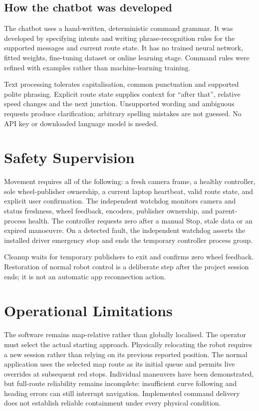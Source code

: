\documentclass[10pt,a4paper,twocolumn]{article}
\begin{document}
\subsection{How the chatbot was developed}

The chatbot uses a hand-written, deterministic command grammar. It was
developed by specifying intents and writing phrase-recognition rules for the
supported messages and current route state. It has no trained
neural network, fitted weights, fine-tuning dataset or online learning stage.
Command rules were refined with examples rather than machine-learning training.

Text processing tolerates capitalisation, common punctuation and supported
polite phrasing. Explicit route state supplies context for ``after that'',
relative speed changes and the next junction. Unsupported wording and
ambiguous requests produce clarification; arbitrary spelling mistakes are not
guessed. No API key or downloaded language model is needed.

\section{Safety Supervision}

Movement requires all of the following: a fresh camera frame, a healthy
controller, sole wheel-publisher ownership, a current laptop heartbeat, valid
route state, and explicit user confirmation. The independent watchdog monitors
camera and status freshness, wheel feedback, encoders, publisher ownership, and
parent-process health. The controller requests zero after a manual Stop, stale data or an expired
manoeuvre. On a detected fault, the independent watchdog asserts the installed
driver emergency stop and ends the temporary controller process group.

Cleanup waits for temporary publishers to exit and confirms zero wheel
feedback. Restoration of normal robot control is a deliberate step after the
project session ends; it is not an automatic app reconnection action.

\balance
\section{Operational Limitations}

The software remains map-relative rather than globally localised. The operator
must select the actual starting approach. Physically relocating the robot
requires a new session rather than relying on its previous reported position.
The normal application uses the selected map route as its initial queue and
permits live overrides at subsequent red stops. Individual maneuvers have been
demonstrated, but full-route reliability remains incomplete: insufficient curve
following and heading errors can still interrupt navigation. Implemented command
delivery does not establish reliable containment under every physical condition.
\end{document}
